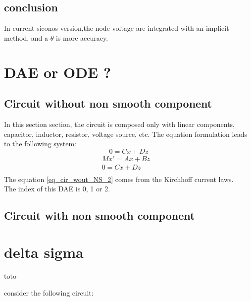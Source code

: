 \subsection{conclusion}
In current siconos version,the node voltage are integrated with an implicit method, and a $\theta$
is more accuracy.


\section{ DAE or ODE ?}

\subsection{Circuit without non smooth component}
In this section section, the circuit is composed only with linear components, capacitor, inductor,
resistor, voltage source, etc. The equation formulation leads to the following system:
\[ \]
\[0 = Cx + Dz \]
 \begin{eqnarray}
Mx'=Ax + Bz&\label{eq_cir_wout_NS_1}\\
0=Cx+ Dz &\label{eq_cir_wout_NS_2}\\
\end{eqnarray}
The equation \ref{eq_cir_wout_NS_2} comes from the Kirchhoff current laws.\\

The index of this DAE is 0, 1 or 2.
\subsection{Circuit with non smooth component}

\newpage
\section{delta sigma}
toto
\begin{figure}[h]

\end{figure}


\newpage
consider the following circuit:
\begin{figure}[h]
\centerline{
 \scalebox{0.7}{
    
 }
}\end{figure}
\\
